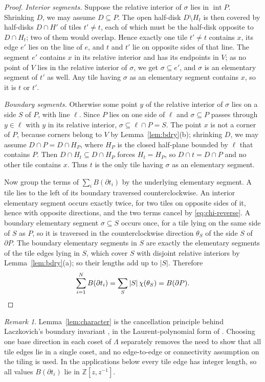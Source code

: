 \documentclass[11pt]{amsart}
\theoremstyle{remark}
\newtheorem{remark}[theorem]{Remark}
\newcommand{\Z}{\mathbb{Z}}
\begin{document}
\begin{proof}
\emph{Interior segments.} Suppose the relative interior of $\sigma$ lies in $\operatorname{int}P$. Shrinking $D$, we may assume $D\subseteq P$. The open half-disk $D\setminus H_t$ is then covered by half-disks $D\cap H'$ of tiles $t'\neq t$, each of which must be the half-disk opposite to $D\cap H_t$; two of them would overlap. Hence exactly one tile $t'\neq t$ contains $x$, its edge $e'$ lies on the line of $e$, and $t$ and $t'$ lie on opposite sides of that line. The segment $e'$ contains $x$ in its relative interior and has its endpoints in $V$; as no point of $V$ lies in the relative interior of $\sigma$, we get $\sigma\subseteq e'$, and $\sigma$ is an elementary segment of $t'$ as well. Any tile having $\sigma$ as an elementary segment contains $x$, so it is $t$ or $t'$.

\emph{Boundary segments.} Otherwise some point $y$ of the relative interior of $\sigma$ lies on a side $S$ of $P$, with line $\ell$. Since $P$ lies on one side of $\ell$ and $\sigma\subseteq P$ passes through $y\in\ell$ with $y$ in its relative interior, $\sigma\subseteq\ell\cap P=S$. The point $x$ is not a corner of $P$, because corners belong to $V$ by Lemma~\ref{lem:bdry}(b); shrinking $D$, we may assume $D\cap P=D\cap H_P$, where $H_P$ is the closed half-plane bounded by $\ell$ that contains $P$. Then $D\cap H_t\subseteq D\cap H_P$ forces $H_t=H_P$, so $D\cap t=D\cap P$ and no other tile contains $x$. Thus $t$ is the only tile having $\sigma$ as an elementary segment.

Now group the terms of $\sum_i B(\partial t_i)$ by the underlying elementary segment. A tile lies to the left of its boundary traversed counterclockwise. An interior elementary segment occurs exactly twice, for two tiles on opposite sides of it, hence with opposite directions, and the two terms cancel by \eqref{eq:chi-reverse}. A boundary elementary segment $\sigma\subseteq S$ occurs once, for a tile lying on the same side of $S$ as $P$, so it is traversed in the counterclockwise direction $\theta_S$ of the side $S$ of $\partial P$. The boundary elementary segments in $S$ are exactly the elementary segments of the tile edges lying in $S$, which cover $S$ with disjoint relative interiors by Lemma~\ref{lem:bdry}(a); so their lengths add up to $|S|$. Therefore
\[
\sum_{i=1}^{N}B(\partial t_i)=\sum_{S}|S|\,\chi(\theta_S)=B(\partial P).\qedhere
\]
\end{proof}

\begin{remark}
Lemma~\ref{lem:character} is the cancellation principle behind Laczkovich's boundary invariant \cite[p.~351]{Lacz12}, in the Laurent-polynomial form of \cite[Section~4]{Progress634}. Choosing one base direction in each coset of $\Lambda$ separately removes the need to show that all tile edges lie in a single coset, and no edge-to-edge or connectivity assumption on the tiling is used. In the applications below every tile edge has integer length, so all values $B(\partial t_i)$ lie in $\Z[z,z^{-1}]$.
\end{remark}
\end{document}
